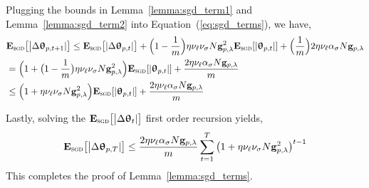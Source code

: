 \documentclass{article}
\begin{document}
Plugging the bounds in	Lemma~\ref{lemma:sgd_term1} and Lemma~\ref{lemma:sgd_term2} into Equation~(\ref{eq:sgd_terms}),  we have,
\begin{equation*} 	
\begin{split}
& \mathbf{E}_{\textsc{sgd}}  \big[\big|\Delta \bm{\uptheta}_{p, t+1} | \big] \leq \mathbf{E}_{\textsc{sgd}}  \big[|\Delta \bm{\uptheta}_{p, t} | \big] + \Big(1-\frac{1}{m}\Big) \eta\nu_{\ell}  \nu_{\sigma}  N \mathbf{g}_{p, \lambda}^2    \mathbf{E}_{\textsc{sgd}}   [ |     \bm{\uptheta}_{p, t}|  ]   + \Big(\frac{1}{m}\Big) 2\eta \nu_{\ell} \alpha_{\sigma} N\mathbf{g}_{p, \lambda} \\ 
& = \Big( 1 + \big(1-\frac{1}{m}\big) \eta\nu_{\ell}  \nu_{\sigma} N \mathbf{g}_{p, \lambda}^2 \Big)   \mathbf{E}_{\textsc{sgd}}   [ |     \bm{\uptheta}_{p, t}|  ]    + \frac{2\eta \nu_{\ell} \alpha_{\sigma} N\mathbf{g}_{p, \lambda} }{m}  \\ 
& \leq \Big( 1 + \eta\nu_{\ell}  \nu_{\sigma} N\mathbf{g}_{p, \lambda}^2  \Big)   \mathbf{E}_{\textsc{sgd}}   [ |     \bm{\uptheta}_{p, t}|  ]    + \frac{2\eta \nu_{\ell} \alpha_{\sigma} N \mathbf{g}_{p, \lambda}   }{m}   \\
\end{split}
\end{equation*}

Lastly,   solving the $\mathbf{E}_{\textsc{sgd}} \big[\big|\Delta\bm{\uptheta}_{t} | \big]$ first order recursion yields, 
\begin{equation*} 	
\begin{split}	
& \mathbf{E}_{\textsc{sgd}}  \big[\big|\Delta \bm{\uptheta}_{p, T} | \big]   \leq    \frac{2\eta \nu_{\ell} \alpha_{\sigma} N \mathbf{g}_{p, \lambda} }{m}  \sum_{t=1}^{T} \big( 1 + \eta\nu_{\ell}  \nu_{\sigma} N \mathbf{g}_{p, \lambda}^2 \big)^{t-1}  \\
\end{split}
\end{equation*}
This completes the proof of Lemma~\ref{lemma:sgd_terms}. \\
\end{document}
